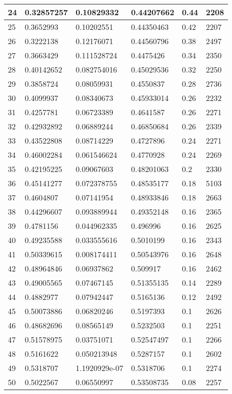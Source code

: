 \begin{longtable}{|l|l|l|l|l|l|}
24 & 0.32857257 & 0.10829332 & 0.44207662 & 0.44 & 2208 \\ \hline 
25 & 0.3652993 & 0.10202551 & 0.44350463 & 0.42 & 2207 \\ \hline 
26 & 0.3222138 & 0.12176071 & 0.44560796 & 0.38 & 2497 \\ \hline 
27 & 0.3663429 & 0.111528724 & 0.4475426 & 0.34 & 2350 \\ \hline 
28 & 0.40142652 & 0.082754016 & 0.45029536 & 0.32 & 2250 \\ \hline 
29 & 0.3858724 & 0.08059931 & 0.4550837 & 0.28 & 2736 \\ \hline 
30 & 0.4099937 & 0.08340673 & 0.45933014 & 0.26 & 2232 \\ \hline 
31 & 0.4257781 & 0.06723389 & 0.4641587 & 0.26 & 2271 \\ \hline 
32 & 0.42932892 & 0.06889244 & 0.46850684 & 0.26 & 2339 \\ \hline 
33 & 0.43522808 & 0.08714229 & 0.4727896 & 0.24 & 2271 \\ \hline 
34 & 0.46002284 & 0.061546624 & 0.4770928 & 0.24 & 2269 \\ \hline 
35 & 0.42195225 & 0.09067603 & 0.48201063 & 0.2 & 2330 \\ \hline 
36 & 0.45141277 & 0.072378755 & 0.48535177 & 0.18 & 5103 \\ \hline 
37 & 0.4604807 & 0.07141954 & 0.48933846 & 0.18 & 2663 \\ \hline 
38 & 0.44296607 & 0.093889944 & 0.49352148 & 0.16 & 2365 \\ \hline 
39 & 0.4781156 & 0.044962335 & 0.496996 & 0.16 & 2625 \\ \hline 
40 & 0.49235588 & 0.033555616 & 0.5010199 & 0.16 & 2343 \\ \hline 
41 & 0.50339615 & 0.008174411 & 0.50543976 & 0.16 & 2648 \\ \hline 
42 & 0.48964846 & 0.06937862 & 0.509917 & 0.16 & 2462 \\ \hline 
43 & 0.49005565 & 0.07467145 & 0.51355135 & 0.14 & 2289 \\ \hline 
44 & 0.4882977 & 0.07942447 & 0.5165136 & 0.12 & 2492 \\ \hline 
45 & 0.50073886 & 0.06820246 & 0.5197393 & 0.1 & 2626 \\ \hline 
46 & 0.48682696 & 0.08565149 & 0.5232503 & 0.1 & 2251 \\ \hline 
47 & 0.51578975 & 0.03751071 & 0.52547497 & 0.1 & 2266 \\ \hline 
48 & 0.5161622 & 0.050213948 & 0.5287157 & 0.1 & 2602 \\ \hline 
49 & 0.5318707 & 1.1920929e-07 & 0.5318706 & 0.1 & 2274 \\ \hline 
50 & 0.5022567 & 0.06550997 & 0.53508735 & 0.08 & 2257 \\ \hline 
\end{longtable}